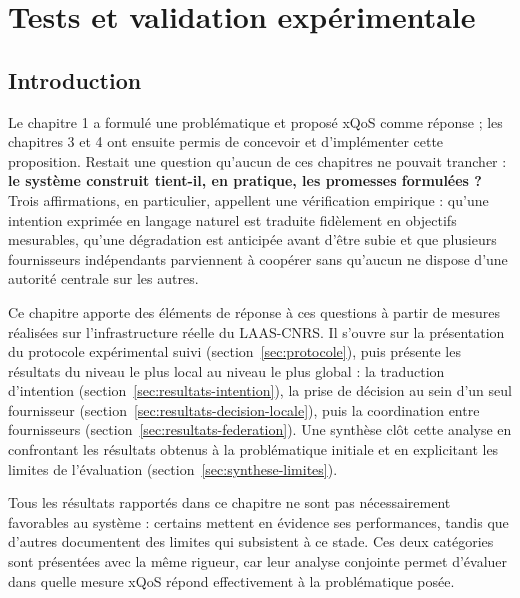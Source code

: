 \newpage
\pagestyle{fancy}

\renewcommand{\headrulewidth}{0.5pt}
\renewcommand{\footrulewidth}{0.5pt}
\chapter{Tests et validation expérimentale}\setlength{\headheight}{27.06pt}
\label{ch5}
\minitoc

\newpage
\section{Introduction}
\label{sec:tests-introduction}

Le chapitre 1 a formulé une problématique et proposé xQoS comme réponse ; les chapitres 3 et 4 ont ensuite permis de concevoir et d'implémenter cette proposition. Restait une question qu'aucun de ces chapitres ne pouvait trancher : \textbf{le système construit tient-il, en pratique, les promesses formulées ?} Trois affirmations, en particulier, appellent une vérification empirique : qu'une intention exprimée en langage naturel est traduite fidèlement en objectifs mesurables, qu'une dégradation est anticipée avant d'être subie et que plusieurs fournisseurs indépendants parviennent à coopérer sans qu'aucun ne dispose d'une autorité centrale sur les autres.

Ce chapitre apporte des éléments de réponse à ces questions à partir de mesures réalisées sur l'infrastructure réelle du LAAS-CNRS. Il s'ouvre sur la présentation du protocole expérimental suivi (section~\ref{sec:protocole}), puis présente les résultats du niveau le plus local au niveau le plus global : la traduction d'intention (section~\ref{sec:resultats-intention}), la prise de décision au sein d'un seul fournisseur (section~\ref{sec:resultats-decision-locale}), puis la coordination entre fournisseurs (section~\ref{sec:resultats-federation}). Une synthèse clôt cette analyse en confrontant les résultats obtenus à la problématique initiale et en explicitant les limites de l'évaluation (section~\ref{sec:synthese-limites}).

Tous les résultats rapportés dans ce chapitre ne sont pas nécessairement favorables au système : certains mettent en évidence ses performances, tandis que d'autres documentent des limites qui subsistent à ce stade. Ces deux catégories sont présentées avec la même rigueur, car leur analyse conjointe permet d'évaluer dans quelle mesure xQoS répond effectivement à la problématique posée.

